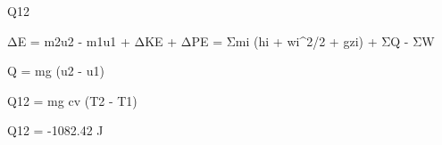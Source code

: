 Q12

ΔE = m2u2 - m1u1 + ΔKE + ΔPE = Σmi (hi + wi^2/2 + gzi) + ΣQ - ΣW

Q = mg (u2 - u1)

Q12 = mg cv (T2 - T1)

Q12 = -1082.42 J